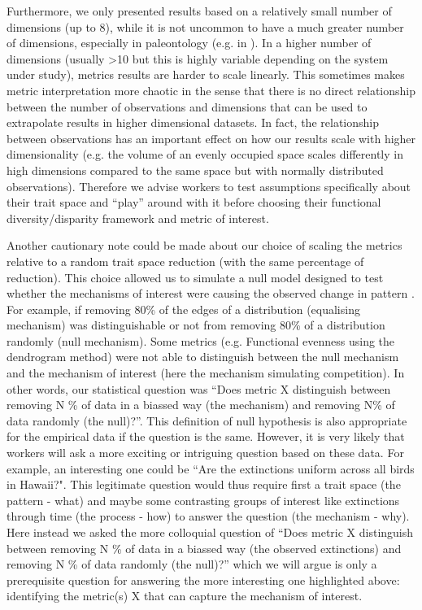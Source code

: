 \documentclass[12pt,letterpaper]{article}
\begin{document}
Furthermore, we only presented results based on a relatively small number of dimensions (up to 8), while it is not uncommon to have a much greater number of dimensions, especially in paleontology (e.g. in \citealt{van2023should}).
In a higher number of dimensions (usually >10 but this is highly variable depending on the system under study), metrics results are harder to scale linearly.
This sometimes makes metric interpretation more chaotic \cite{bellman1957dynamic} in the sense that there is no direct relationship between the number of observations and dimensions that can be used to extrapolate results in higher dimensional datasets.
In fact, the relationship between observations has an important effect on how our results scale with higher dimensionality (e.g. the volume of an evenly occupied space scales differently in high dimensions compared to the same space but with normally distributed observations).
Therefore we advise workers to test assumptions specifically about their trait space and ``play'' around with it before choosing their functional diversity/disparity framework and metric of interest.


Another cautionary note could be made about our choice of scaling the metrics relative to a random trait space reduction (with the same percentage of reduction).
This choice allowed us to simulate a null model designed to test whether the mechanisms of interest were causing the observed change in pattern \cite{bausman2018modeling}.
For example, if removing 80\% of the edges of a distribution (equalising mechanism) was distinguishable or not from removing 80\% of a distribution randomly (null mechanism).
Some metrics (e.g. Functional evenness using the dendrogram method) were not able to distinguish between the null mechanism and the mechanism of interest (here the mechanism simulating competition).
In other words, our statistical question was ``Does metric X distinguish between removing N \% of data in a biassed way (the mechanism) and removing N\% of data randomly (the null)?''.
This definition of null hypothesis is also appropriate for the empirical data if the question is the same.
However, it is very likely that workers will ask a more exciting or intriguing question based on these data.
For example, an interesting one could be ``Are the extinctions uniform across all birds in Hawaii?".
This legitimate question would thus require first a trait space (the pattern - what) and maybe some contrasting groups of interest like extinctions through time (the process - how) to answer the question (the mechanism - why).
Here instead we asked the more colloquial question of  ``Does metric X distinguish between removing N \% of data in a biassed way (the observed extinctions) and removing N \% of data randomly (the null)?'' which we will argue is only a prerequisite question for answering the more interesting one highlighted above: identifying the metric(s) X that can capture the mechanism of interest.
\end{document}
